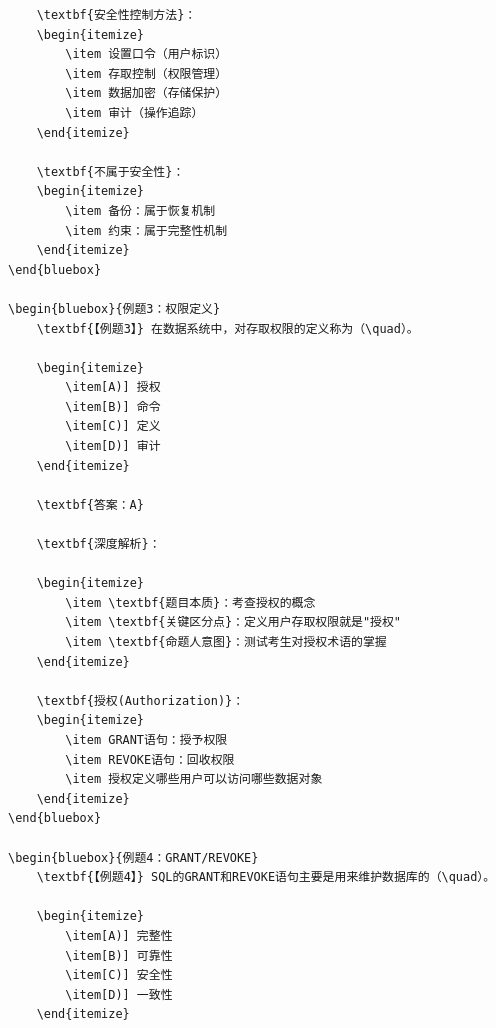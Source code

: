 \documentclass[12pt, a4paper]{article}
\newenvironment{bluebox}[1]{%
  \begin{trivlist}
  \item[\hskip\labelsep \textbf{#1}]
  \setlength{\parskip}{0.5ex}
  \setlength{\itemsep}{0.5ex}
}{%
  \end{trivlist}
}
\begin{document}
\begin{bluebox}{用户管理}
\begin{enumerate}[leftmargin=*, label=\textbf{\arabic*.}]
\begin{verbatim}
	\textbf{安全性控制方法}：
	\begin{itemize}
		\item 设置口令（用户标识）
		\item 存取控制（权限管理）
		\item 数据加密（存储保护）
		\item 审计（操作追踪）
	\end{itemize}

	\textbf{不属于安全性}：
	\begin{itemize}
		\item 备份：属于恢复机制
		\item 约束：属于完整性机制
	\end{itemize}
\end{bluebox}

\begin{bluebox}{例题3：权限定义}
	\textbf{【例题3】} 在数据系统中，对存取权限的定义称为（\quad）。

	\begin{itemize}
		\item[A)] 授权
		\item[B)] 命令
		\item[C)] 定义
		\item[D)] 审计
	\end{itemize}

	\textbf{答案：A}

	\textbf{深度解析}：

	\begin{itemize}
		\item \textbf{题目本质}：考查授权的概念
		\item \textbf{关键区分点}：定义用户存取权限就是"授权"
		\item \textbf{命题人意图}：测试考生对授权术语的掌握
	\end{itemize}

	\textbf{授权(Authorization)}：
	\begin{itemize}
		\item GRANT语句：授予权限
		\item REVOKE语句：回收权限
		\item 授权定义哪些用户可以访问哪些数据对象
	\end{itemize}
\end{bluebox}

\begin{bluebox}{例题4：GRANT/REVOKE}
	\textbf{【例题4】} SQL的GRANT和REVOKE语句主要是用来维护数据库的（\quad）。

	\begin{itemize}
		\item[A)] 完整性
		\item[B)] 可靠性
		\item[C)] 安全性
		\item[D)] 一致性
	\end{itemize}


\end{verbatim}
\end{enumerate}
\end{bluebox}
\end{document}
